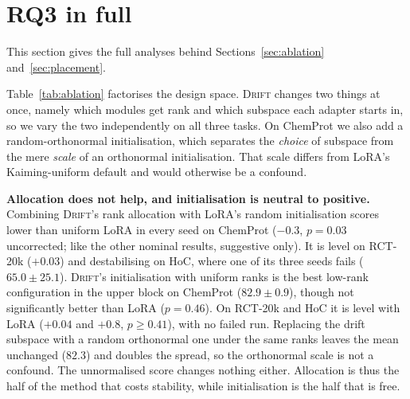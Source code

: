 \documentclass[conference,onecolumn]{IEEEtran}
\newcommand{\method}{\textsc{Drift}}
\begin{document}
\section{RQ3 in full}
\label{sup:rq3}
This section gives the full analyses behind Sections~\ref{sec:ablation} and~\ref{sec:placement}.

Table~\ref{tab:ablation} factorises the design space. \method{} changes two
things at once, namely which modules get rank and which subspace each adapter
starts in, so we vary the two independently on all three tasks. On ChemProt we
also add a random-orthonormal initialisation, which separates the \emph{choice}
of subspace from the mere \emph{scale} of an orthonormal initialisation. That
scale differs from LoRA's Kaiming-uniform default and would otherwise be a
confound.

\noindent\textbf{Allocation does not help, and initialisation is neutral to
positive.} Combining \method{}'s rank allocation with LoRA's random
initialisation scores lower than uniform LoRA in every seed on ChemProt
($-0.3$, $p = 0.03$ uncorrected; like the other nominal results, suggestive
only). It is level on RCT-20k ($+0.03$) and destabilising on HoC, where one of
its three seeds fails ($65.0\pm25.1$). \method{}'s initialisation with uniform
ranks is the best low-rank configuration in the upper block on ChemProt
($82.9\pm0.9$), though not significantly better than LoRA ($p = 0.46$). On
RCT-20k and HoC it is level with LoRA ($+0.04$ and $+0.8$, $p \ge 0.41$), with
no failed run. Replacing the drift subspace with a random orthonormal one under
the same ranks leaves the mean unchanged ($82.3$) and doubles the spread, so the
orthonormal scale is not a confound. The unnormalised score changes nothing
either. Allocation is thus the half of the method that costs stability, while
initialisation is the half that is free.
\end{document}
